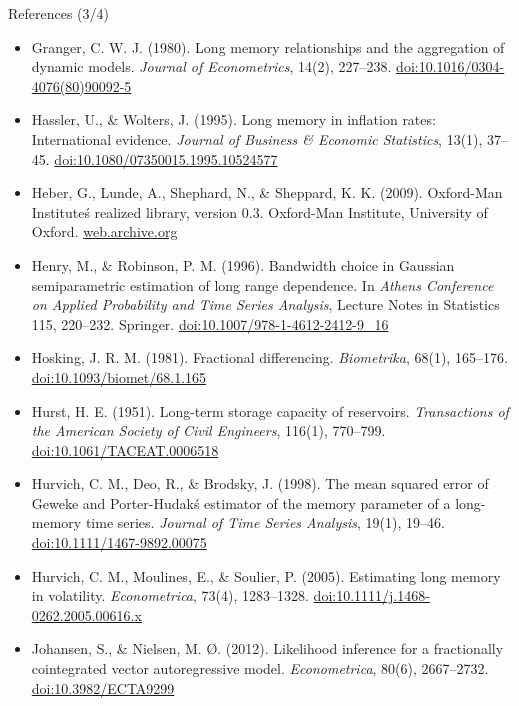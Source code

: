 \begin{frame}{References (3/4)}
\itemsize{\tiny}
\begin{itemize}
    \item Granger, C. W. J. (1980). Long memory relationships and the aggregation of dynamic models. \textit{Journal of Econometrics}, 14(2), 227--238. \href{https://doi.org/10.1016/0304-4076(80)90092-5}{doi:10.1016/0304-4076(80)90092-5}
    \item Hassler, U., \& Wolters, J. (1995). Long memory in inflation rates: International evidence. \textit{Journal of Business \& Economic Statistics}, 13(1), 37--45. \href{https://doi.org/10.1080/07350015.1995.10524577}{doi:10.1080/07350015.1995.10524577}
    \item Heber, G., Lunde, A., Shephard, N., \& Sheppard, K. K. (2009). Oxford-Man Institute\'s realized library, version 0.3. Oxford-Man Institute, University of Oxford. \href{https://web.archive.org/web/20220301022212/https://realized.oxford-man.ox.ac.uk/}{web.archive.org}
    \item Henry, M., \& Robinson, P. M. (1996). Bandwidth choice in Gaussian semiparametric estimation of long range dependence. In \textit{Athens Conference on Applied Probability and Time Series Analysis}, Lecture Notes in Statistics 115, 220--232. Springer. \href{https://doi.org/10.1007/978-1-4612-2412-9_16}{doi:10.1007/978-1-4612-2412-9\_16}
    \item Hosking, J. R. M. (1981). Fractional differencing. \textit{Biometrika}, 68(1), 165--176. \href{https://doi.org/10.1093/biomet/68.1.165}{doi:10.1093/biomet/68.1.165}
    \item Hurst, H. E. (1951). Long-term storage capacity of reservoirs. \textit{Transactions of the American Society of Civil Engineers}, 116(1), 770--799. \href{https://doi.org/10.1061/TACEAT.0006518}{doi:10.1061/TACEAT.0006518}
    \item Hurvich, C. M., Deo, R., \& Brodsky, J. (1998). The mean squared error of Geweke and Porter-Hudak\'s estimator of the memory parameter of a long-memory time series. \textit{Journal of Time Series Analysis}, 19(1), 19--46. \href{https://doi.org/10.1111/1467-9892.00075}{doi:10.1111/1467-9892.00075}
    \item Hurvich, C. M., Moulines, E., \& Soulier, P. (2005). Estimating long memory in volatility. \textit{Econometrica}, 73(4), 1283--1328. \href{https://doi.org/10.1111/j.1468-0262.2005.00616.x}{doi:10.1111/j.1468-0262.2005.00616.x}
    \item Johansen, S., \& Nielsen, M. Ø. (2012). Likelihood inference for a fractionally cointegrated vector autoregressive model. \textit{Econometrica}, 80(6), 2667--2732. \href{https://doi.org/10.3982/ECTA9299}{doi:10.3982/ECTA9299}

\end{itemize}
\end{frame}

